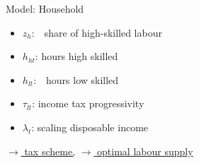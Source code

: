 \documentclass[11pt,aspectratio=169]{beamer}
\begin{document}
\begin{frame}{Model: Household}
\small
\vspace{4mm}
\begin{minipage}[t!]{0.4\textwidth}
	\vspace{7mm}
	\begin{itemize}
		\item[] $z_h$:\ \ share of high-skilled labour \vspace{-2mm}
		\item[] $h_{ht}$: hours high skilled\vspace{-2mm}
		\item[] $h_{lt}$:\ \ hours low skilled\vspace{-2mm}
	\end{itemize}
\end{minipage}
\begin{minipage}[t!]{0.4\textwidth}
	\vspace{8mm}
	\begin{itemize}
		\item[] $\tau_{lt}$: income tax progressivity
		\vspace{-2mm}	
		\item[] $\lambda_{t}$: scaling disposable income
	\end{itemize}
\end{minipage}


\vspace{6mm}
\hfill
\hyperlink{taxsc}{\tiny{$\rightarrow$ tax scheme,}} \hyperlink{opth}{\tiny{$\rightarrow$ optimal labour supply}} 

\end{frame}
\end{document}
